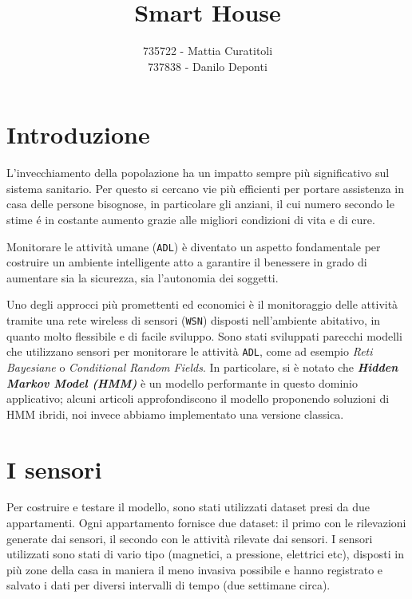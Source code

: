 \documentclass[12pt, a4paper]{scrartcl}
\title{\textbf{Smart House}}
\author{735722 - Mattia Curatitoli\\ 737838 - Danilo Deponti} \date{}
\begin{document}
\maketitle
 
\section*{Introduzione}
L'invecchiamento della popolazione ha un impatto sempre più significativo sul sistema sanitario. Per questo si cercano vie più efficienti per portare assistenza in casa delle persone bisognose, in particolare gli anziani, il cui numero secondo le stime é in costante aumento grazie alle migliori condizioni di vita e di cure.

Monitorare le attività umane (\texttt{ADL}) è diventato un aspetto fondamentale per costruire un ambiente intelligente atto a garantire il benessere in grado di aumentare sia la sicurezza, sia l'autonomia dei soggetti.

Uno degli approcci più promettenti ed economici è il monitoraggio delle attività tramite una rete wireless di sensori (\texttt{WSN}) disposti nell'ambiente abitativo, in quanto molto flessibile e di facile sviluppo.
Sono stati sviluppati parecchi modelli che utilizzano sensori per monitorare le attività \texttt{ADL}, come ad esempio \emph{Reti Bayesiane} o \emph{Conditional Random Fields}. In particolare, si è notato che \emph{\textbf{Hidden Markov Model (HMM)}} è un modello performante in questo dominio applicativo; alcuni articoli approfondiscono il modello proponendo soluzioni di HMM ibridi, noi invece abbiamo implementato una versione classica.

\section*{I sensori}
Per costruire e testare il modello, sono stati utilizzati dataset presi da due appartamenti. Ogni appartamento fornisce due dataset: il primo con le rilevazioni generate dai sensori, il secondo con le attività rilevate dai sensori.
I sensori utilizzati sono stati di vario tipo (magnetici, a pressione, elettrici etc), disposti in più zone della casa in maniera il meno invasiva possibile e hanno registrato e salvato i dati per diversi intervalli di tempo (due settimane circa).
\end{document}
